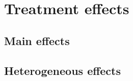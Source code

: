 \documentclass[10pt]{article}
\begin{document}
	\clearpage

\section{Treatment effects}

	\subsection{Main effects}

		\begin{landscape}  \end{landscape}
		\begin{landscape}  \end{landscape}
		\begin{landscape}  \end{landscape}
		\begin{landscape}  \end{landscape}
		\begin{landscape}  \end{landscape}
		\begin{landscape}  \end{landscape}
		\begin{landscape}  \end{landscape}
		\begin{landscape}  \end{landscape}

	\clearpage

	\subsection{Heterogeneous effects}
\end{document}
